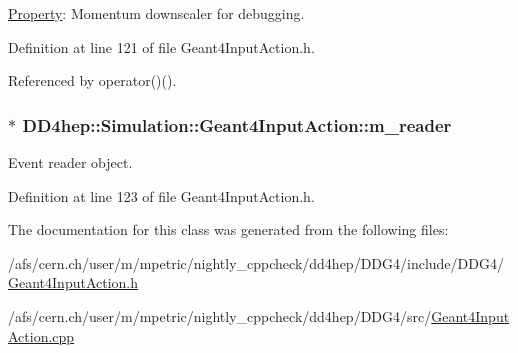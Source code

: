\hyperlink{class_d_d4hep_1_1_property}{Property}: Momentum downscaler for debugging. 

Definition at line 121 of file Geant4InputAction.h.

Referenced by operator()().\hypertarget{class_d_d4hep_1_1_simulation_1_1_geant4_input_action_a68fd56256e10008e15de70d07797456c}{
\subsubsection[{m\_\-reader}]{$\ast$ {\bf DD4hep::Simulation::Geant4InputAction::m\_\-reader}}}
\label{class_d_d4hep_1_1_simulation_1_1_geant4_input_action_a68fd56256e10008e15de70d07797456c}


Event reader object. 

Definition at line 123 of file Geant4InputAction.h.

The documentation for this class was generated from the following files:\begin{DoxyCompactItemize}
\item 
/afs/cern.ch/user/m/mpetric/nightly\_\-cppcheck/dd4hep/DDG4/include/DDG4/\hyperlink{_geant4_input_action_8h}{Geant4InputAction.h}\item 
/afs/cern.ch/user/m/mpetric/nightly\_\-cppcheck/dd4hep/DDG4/src/\hyperlink{_geant4_input_action_8cpp}{Geant4InputAction.cpp}\end{DoxyCompactItemize}
